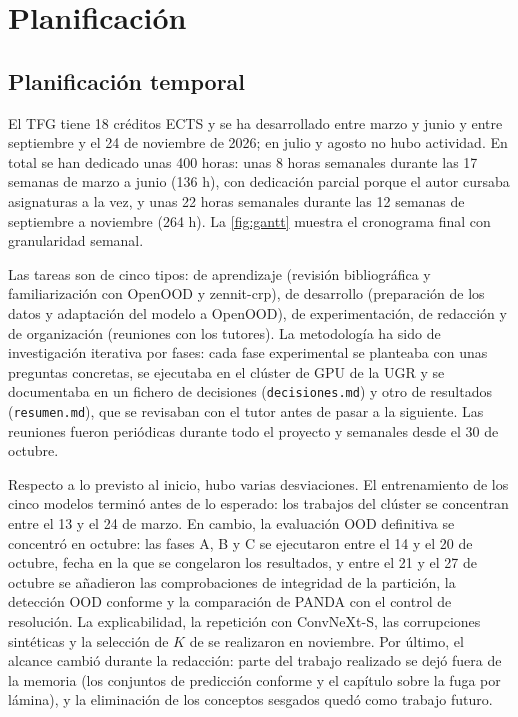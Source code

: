 \section{Planificación}\label{sec:planificacion}

\subsection{Planificación temporal}\label{sec:planificacion-temporal}

El TFG tiene 18 créditos ECTS y se ha desarrollado entre marzo y junio y entre septiembre y el 24 de noviembre de 2026; en julio y agosto no hubo actividad. En total se han dedicado unas 400 horas: unas 8 horas semanales durante las 17 semanas de marzo a junio (136 h), con dedicación parcial porque el autor cursaba asignaturas a la vez, y unas 22 horas semanales durante las 12 semanas de septiembre a noviembre (264 h). La \cref{fig:gantt} muestra el cronograma final con granularidad semanal.

Las tareas son de cinco tipos: de aprendizaje (revisión bibliográfica y familiarización con OpenOOD y zennit-crp), de desarrollo (preparación de los datos y adaptación del modelo a OpenOOD), de experimentación, de redacción y de organización (reuniones con los tutores). La metodología ha sido de investigación iterativa por fases: cada fase experimental se planteaba con unas preguntas concretas, se ejecutaba en el clúster de GPU de la UGR y se documentaba en un fichero de decisiones (\texttt{decisiones.md}) y otro de resultados (\texttt{resumen.md}), que se revisaban con el tutor antes de pasar a la siguiente. Las reuniones fueron periódicas durante todo el proyecto y semanales desde el 30 de octubre.

Respecto a lo previsto al inicio, hubo varias desviaciones. El entrenamiento de los cinco modelos terminó antes de lo esperado: los trabajos del clúster se concentran entre el 13 y el 24 de marzo. En cambio, la evaluación OOD definitiva se concentró en octubre: las fases A, B y C se ejecutaron entre el 14 y el 20 de octubre, fecha en la que se congelaron los resultados, y entre el 21 y el 27 de octubre se añadieron las comprobaciones de integridad de la partición, la detección OOD conforme y la comparación de PANDA con el control de resolución. La explicabilidad, la repetición con ConvNeXt-S, las corrupciones sintéticas y la selección de $K$ de \stoodx se realizaron en noviembre. Por último, el alcance cambió durante la redacción: parte del trabajo realizado se dejó fuera de la memoria (los conjuntos de predicción conforme y el capítulo sobre la fuga por lámina), y la eliminación de los conceptos sesgados quedó como trabajo futuro.

